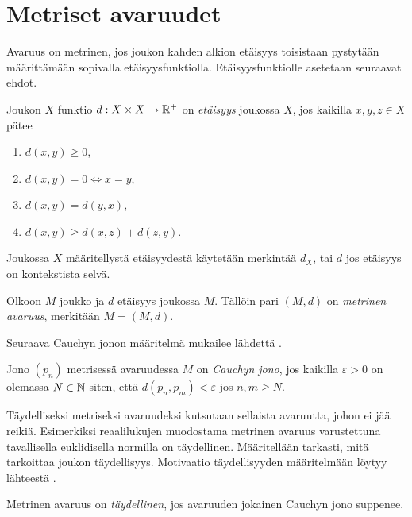 \documentclass[12pt,oneside,a4paper]{amsbook} %
\begin{document}
\section{Metriset avaruudet}

Avaruus on metrinen, jos joukon kahden alkion etäisyys toisistaan pystytään määrittämään sopivalla etäisyysfunktiolla. Etäisyysfunktiolle asetetaan seuraavat ehdot.

\begin{definition}
    Joukon $X$ funktio $d: X\times X \to \mathbb{R}^+$ on \textit{etäisyys} joukossa $X$, jos kaikilla $x, y, z \in X$ pätee
    \begin{enumerate}
        \item $d(x,y) \ge 0$,
        \item $d(x,y) = 0 \iff x = y$,
        \item $d(x,y) = d(y,x)$,
        \item $d(x,y) \ge d(x,z) + d(z,y)$.
    \end{enumerate}
    Joukossa $X$ määritellystä etäisyydestä käytetään merkintää $d_X$, tai $d$ jos etäisyys on kontekstista selvä. 
\end{definition}

\begin{definition}
    Olkoon $M$ joukko ja $d$ etäisyys joukossa $M$. Tällöin pari $(M, d)$ on \textit{metrinen avaruus}, merkitään $M = (M, d)$.
\end{definition}

Seuraava Cauchyn jonon määritelmä mukailee lähdettä  \cite[s.52]{rudin}.

\begin{definition}
    Jono $(p_n)$ metrisessä avaruudessa $M$ on \textit{Cauchyn jono}, jos kaikilla $\varepsilon > 0$ on olemassa $N\in \mathbf{\mathbb{N}}$ siten, että $d(p_n, p_m) < \varepsilon$ jos $n, m\ge N$.
\end{definition}

Täydelliseksi metriseksi avaruudeksi kutsutaan sellaista avaruutta, johon ei jää reikiä. Esimerkiksi reaalilukujen muodostama metrinen avaruus varustettuna tavallisella euklidisella normilla on täydellinen. Määritellään tarkasti, mitä tarkoittaa joukon täydellisyys. Motivaatio täydellisyyden määritelmään löytyy lähteestä \cite[s.54]{rudin}.

\begin{definition}
    Metrinen avaruus on \textit{täydellinen}, jos avaruuden jokainen Cauchyn jono suppenee. 
\end{definition} 
\end{document}

